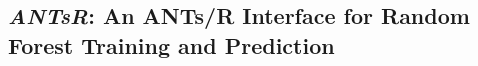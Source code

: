 %
%










\subsection{\textit{ANTsR}:  An ANTs/R Interface for Random Forest Training and Prediction}

